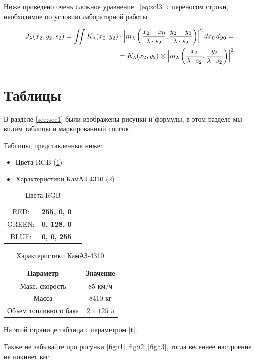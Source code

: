 \documentclass[a4paper,12pt]{article}         %
\begin{document}
Ниже приведено очень сложное уравнение ~\ref{eq:sol3} с переносом строки, необходимое по условию лабораторной работы.


\begin{eqnarray}\label{eq:sol3}
J_\lambda(x_2, y_2, s_2) =
\iint K_\lambda(x_2, y_2) \cdot \Bigl| m_\lambda
\left(
\frac{x_2-x_0}{\lambda \cdot s_2} , \frac{y_2-y_0}{\lambda \cdot s_2}\right)\Bigr|^2 \,dx_0\,dy_0 = \nonumber \\
= K_\lambda(x_2, y_2) \otimes \Bigl| m_\lambda \left( \frac{x_2}{\lambda \cdot s_2} , \frac{y_2}{\lambda \cdot s_2} \right) \Bigr|^2
\end{eqnarray}
\newpage
\section{Таблицы}
\label{sec:sec2}
В разделе \ref{sec:sec1} были изображены рисунки и формулы, в этом разделе мы видим таблицы и маркированный список.

Таблицы, представленные ниже:
\begin{itemize}
	\item Цвета RGB (\ref{tabular:t1})
	\item Характеристики КамАЗ-4310 (\ref{tabular:t2})
\end{itemize}
\begin{table}[h]

	\caption{Цвета RGB}
	\label{tabular:t1}
	\begin{center}
		\begin{tabular}{ccc}
			RED: & \textbf{255, 0, 0}\\
			GREEN: & \textbf{0, 128, 0} \\
			BLUE: & \textbf{0, 0, 255}\\
		\end{tabular}
	\end{center}
\end{table}
\begin{table}[t]
\caption{\label{tabular:t2}Характеристики КамАЗ-4310.}
\begin{center}
	\begin{tabular}{|c|c|}
		\hline
		Параметр & Значение \\
		\hline
		Макс. скорость & 85 км/ч \\
		Масса &  8410 кг \\
		Объем топливного бака & $2 \times 125$ л \\
		\hline
		
	\end{tabular}
\end{center}
\end{table} 
\newpage
На этой странице таблица с параметром [t]. 

Также не забывайте про рисунки \ref{fig:i1},\ref{fig:i2},\ref{fig:i3}, тогда весеннее настроение не покинет вас.
\newpage
\end{document}
